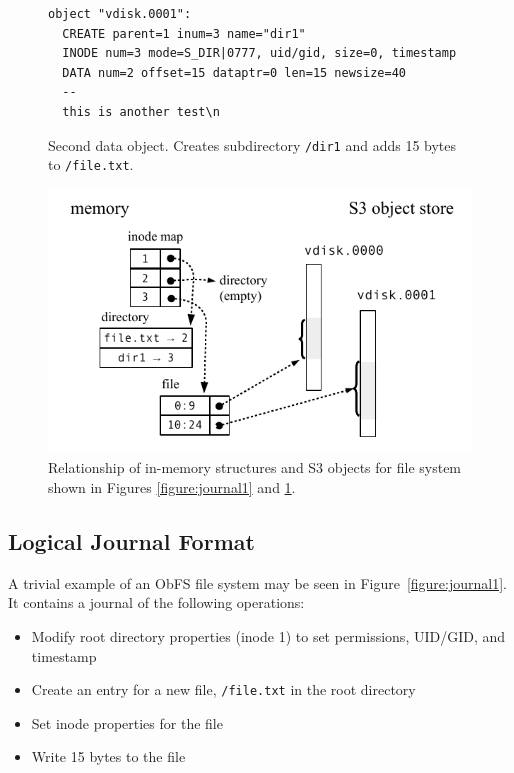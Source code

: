 \begin{figure}
\begin{framed}
 {\footnotesize
\begin{verbatim}
object "vdisk.0001":
  CREATE parent=1 inum=3 name="dir1"
  INODE num=3 mode=S_DIR|0777, uid/gid, size=0, timestamp
  DATA num=2 offset=15 dataptr=0 len=15 newsize=40
  --
  this is another test\n
\end{verbatim} }
\end{framed}
  \caption{Second data object. \rm Creates subdirectory \texttt{/dir1} and adds 15 bytes to \texttt{/file.txt}.}
  \label{figure:journal2}
\end{figure}


\begin{figure}
\centering
\includegraphics[width=0.95\columnwidth]{figs/obfs.pdf}
\caption{Relationship of in-memory structures and S3 objects for file system shown in Figures \ref{figure:journal1} and \ref{figure:journal2}.}
\label{figure:picture}
\end{figure}

\subsection{Logical Journal Format}

A trivial example of an ObFS file system may be seen in Figure~\ref{figure:journal1}.
It contains a journal of the following operations:
\begin{itemize}[nosep]
\item Modify root directory properties (inode 1) to set permissions, UID/GID, and timestamp
\item Create an entry for a new file, \texttt{/file.txt} in the root directory
\item Set inode properties for the file
\item Write 15 bytes to the file
\end{itemize}

